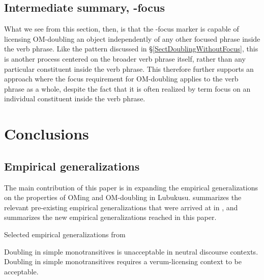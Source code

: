 \documentclass[output=paper]{langscibook}
\begin{document}


\subsection{Intermediate summary, \Ne-focus}

What we see from this section, then, is that the \Ne-focus marker is capable of licensing OM-doubling an object independently of any other focused phrase inside the verb phrase. Like the pattern discussed in \S \ref{SectDoublingWithoutFocus}, this is another process centered on the broader verb phrase itself, rather than any particular constituent inside the verb phrase. This therefore further supports an approach where the focus requirement for OM-doubling applies to the verb phrase as a whole, despite the fact that it is often realized by term focus on an individual constituent inside the verb phrase. 

\section{Conclusions} \label{SectConclusions}


\subsection{Empirical generalizations}

The main contribution of this paper is in expanding the empirical generalizations on the properties of OMing and OM-doubling in Lubukusu.  summarizes the relevant pre-existing empirical generalizations that were arrived at in \citet{SikukuEtAl:2018:LubukusuOM}, and  summarizes the new empirical generalizations reached in this paper.

\ea Selected empirical generalizations from \citet{SikukuEtAl:2018:LubukusuOM} \label{SummaryEmpiricalGen2018}
   \begin{xlist}
   \ex Doubling in simple monotransitives is unacceptable in neutral discourse contexts.
   \ex Doubling in simple monotransitives requires a verum-licensing context to be acceptable.    
   \end{xlist}
   \z 
   
\end{document}
